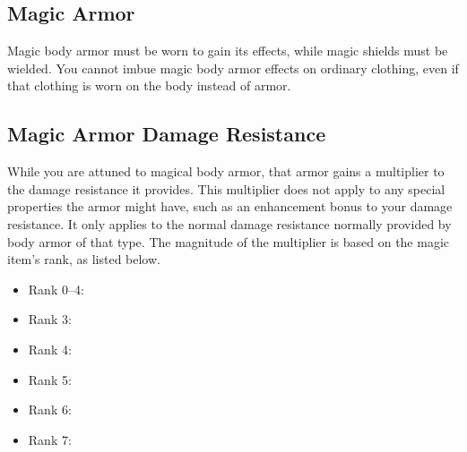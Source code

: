       \begin{longcolumn}
        \section{Magic Armor}
          \begin{longtablepreface}
            Magic body armor must be worn to gain its effects, while magic shields must be wielded.
            You cannot imbue magic body armor effects on ordinary clothing, even if that clothing is worn on the body instead of armor.

            \subsection{Magic Armor Damage Resistance}\label{Magic Armor Damage Resistance}
              While you are attuned to magical body armor, that armor gains a multiplier to the damage resistance it provides.
              This multiplier does not apply to any special properties the armor might have, such as an enhancement bonus to your damage resistance.
              It only applies to the normal damage resistance normally provided by body armor of that type.
              The magnitude of the multiplier is based on the magic item's rank, as listed below.

              \begin{itemize}
                \item Rank 0--4: 
                \item Rank 3: 
                \item Rank 4: 
                \item Rank 5: 
                \item Rank 6: 
                \item Rank 7: 
              \end{itemize}
          \end{longtablepreface}

          

      \end{longcolumn}

      

